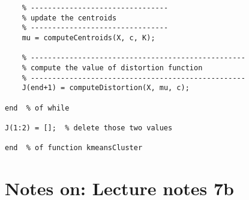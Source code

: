 \documentclass{article}
\begin{document}
\begin{verbatim}
    % --------------------------------
    % update the centroids
    % --------------------------------
    mu = computeCentroids(X, c, K);

    % --------------------------------------------------
    % compute the value of distortion function
    % --------------------------------------------------
    J(end+1) = computeDistortion(X, mu, c);

end  % of while

J(1:2) = [];  % delete those two values

end  % of function kmeansCluster
\end{verbatim}

\section{Notes on: Lecture notes 7b}
\end{document}
